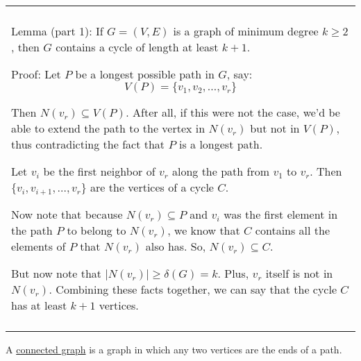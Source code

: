 \documentclass{book}
\newcommand{\hOneOld}{%
   \color{Black}%
   \fontsize{14}{14}\selectfont%
}
\newcommand{\exOneOldd}{%
   \color{Purple}%
   \fontsize{14}{14}\selectfont%
}
\newcommand{\exPOldd}{%
   \color{VioletRed}%
   \fontsize{12}{12}\selectfont%
}
\newenvironment{myConstrict}{%
   \begin{adjustwidth}{2.5em}{2.5em}%
}{%
   \end{adjustwidth}%
}
\newcommand{\udefine}[1]{%
   \setulcolor{Red}%
   \setul{0.14em}{0.07em}%
   \ul{#1}%
}
\newcommand{\uuline}[2][.]{%
{\vphantom{a}\color{#1}%
\rlap{\rule[-0.18em]{\widthof{#2}}{0.06em}}%
\rlap{\rule[-0.32em]{\widthof{#2}}{0.06em}}}%
#2}
\newenvironment{myClosureOne}[2][.]{%
   \color{#1}%
   \begin{tabular}{|p{#2in}|} \hline \\%
}{%
   \\ \\ \hline \end{tabular}%
}
\newcommand{\retTwo}{\hfill\bigbreak}
\begin{document}
\exOneOldd
\begin{center}
\begin{myClosureOne}{5.5}
   \uuline{Lemma (part 1)}: If $G = (V, E)$ is a graph of minimum degree
   $k \geq 2$, then $G$ contains a cycle of length at least
   $k + 1$.

   {\exPOldd \begin{myConstrict}
      Proof: Let $P$ be a longest possible path in $G$, say:
      \[V(P) = \{v_1, v_2, \ldots, v_r\}\]

      Then $N(v_r) \subseteq V(P)$. After all, if this were not 
      the case, we'd be able to extend the path to the vertex in 
      $N(v_r)$ but not in $V(P)$, thus contradicting the fact that
      $P$ is a longest path. \retTwo

      Let $v_i$ be the first neighbor of $v_r$ along the path from
      $v_1$ to $v_r$. Then $\{v_i, v_{i+1}, \ldots, v_r\}$ are the
      vertices of a cycle $C$. \retTwo

      Now note that because $N(v_r) \subseteq P$ and $v_i$ was
      the first element in the path $P$ to belong to $N(v_r)$, 
      we know that $C$ contains all the elements of $P$ that 
      $N(v_r)$ also has. So, $N(v_r) \subseteq C$. \retTwo

      But now note that $\lvert N(v_r) \rvert \geq \delta(G)=k$. Plus,
      $v_r$ itself is not in $N(v_r)$. Combining these facts together,
      we can say that the cycle $C$ has at least $k + 1$ vertices.
   \end{myConstrict}}

   \uuline{Lemma (part 2)}: The cycle length $k+1$ is the longest 
   we can guarentee based on the minimum degree of the graph being $k$.

   {\exPOldd \begin{myConstrict}
      Proof: Take the graph $K_{k+1}$ which has a minimum degree $k$. 
      \newline
      Obviously, the longest cycle in $K_{k+1}$ is the cycle containing
      all $k+1$ elements of $K_{k+1}$. Thus, we have shown that there
      are graphs with minimum degree $k$ which don't have cycles of
      length greater than \newline $k + 1$.
   \end{myConstrict}} 
\end{myClosureOne}
\end{center}
\retTwo

\hOneOld
A \udefine{connected graph} is a graph in which any two vertices
are the ends of a path. \retTwo
\end{document}
